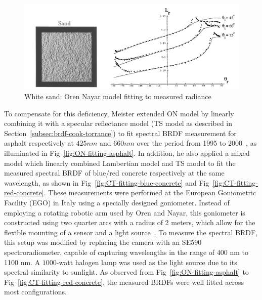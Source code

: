 \begin{figure}[!tb]
    \centering
    \includegraphics[width=0.9\linewidth]{./figures/measurement-literature/ON-fitting-white-sand-full.png}
    \caption{White sand: Oren Nayar model fitting to measured radiance}
    \label{fig:ON-fitting-white-sand}
\end{figure}

To compensate for this deficiency, Meister extended ON model by linearly combining it with a specular reflectance model (TS model as described in Section~\eqref{subsec:brdf-cook-torrance}) to fit spectral BRDF measurement for asphalt respectively at $425nm$ and $660nm$ over the period from 1995 to 2000~\cite{2000_Meister}, as illuminated in Fig~\ref{fig:ON-fitting-asphalt}.
In addition, he also applied a mixed model which linearly combined Lambertian model and TS model to fit the measured spectral BRDF of blue/red concrete respectively at the same wavelength, as shown in Fig~\ref{fig:CT-fitting-blue-concrete} and Fig~\ref{fig:CT-fitting-red-concrete}.
These measurements were performed at the European Goniometric Facility (EGO) in Italy using a specially designed goniometer.
Instead of employing a rotating robotic arm used by Oren and Nayar, this goniometer is constructed using two quarter arcs with a radius of 2 meters, which allow for the flexible mounting of a sensor and a light source~\cite{2000_Meister}.
To measure the spectral BRDF, this setup was modified by replacing the camera with an SE590 spectroradiometer, capable of capturing wavelengths in the range of 400 nm to 1100 nm.
A $1000$-watt halogen lamp was used as the light source due to its spectral similarity to sunlight.
As observed from Fig~\ref{fig:ON-fitting-asphalt} to Fig~\ref{fig:CT-fitting-red-concrete}, the measured BRDFs were well fitted across most configurations.

